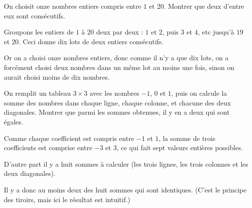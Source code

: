 \begin{exo}
On choisit onze nombres entiers compris entre $1$ et $20$. Montrer que deux d'entre eux sont consécutifs.

\begin{sol}
Groupons les entiers de $1$ à $20$ deux par deux : $1$ et $2$, puis $3$ et $4$, etc jusqu'à $19$ et $20$. Ceci donne dix \og lots\fg{} de deux entiers consécutifs.

Or on a choisi onze nombres entiers, donc comme il n'y a que dix lots, on a forcément choisi deux nombres dans un même lot au moins une fois, sinon on aurait choisi moins de dix nombres.
\end{sol}
\end{exo}



\begin{exo}
On remplit un tableau $3\times 3$  avec les nombres $-1$, $0$ et $1$, puis on calcule la somme des nombres dans chaque ligne, chaque colonne, et chacune des deux diagonales. Montrer que parmi les sommes obtenues, il y en a deux qui sont égales.
\begin{sol}
Comme chaque coefficient est compris entre $-1$ et $1$, la somme de trois coefficients est comprise entre $-3$ et $3$, ce qui fait sept valeurs entières possibles.

D'autre part il y a huit sommes à calculer (les trois lignes, les trois colonnes et les deux diagonales).

Il y a donc au moins deux des huit sommes qui sont identiques. (C'est le principe des tiroirs, mais ici le résultat est intuitif.)
\end{sol}
\end{exo}



